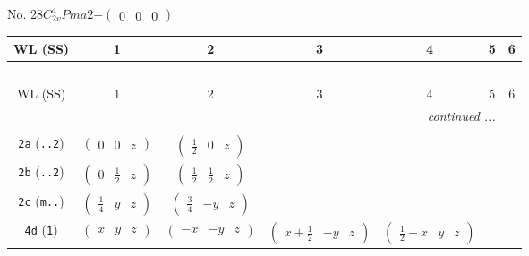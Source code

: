 \documentclass[fleqn,9pt,landscape]{jsarticle}
\begin{document}
\newpage
No. 28\quad$C_{2v}^{4}$\quad$Pma2$\quad[ orthorhombic ]\quad$+\begin{pmatrix} 0 & 0 & 0 \end{pmatrix}$
\begin{center}
\renewcommand{\arraystretch}{1.2}
\begin{longtable}{ccccccc}
 \hline \hline
WL (SS) & 1 & 2 & 3 & 4 & 5 & 6 \\ \hline \endfirsthead

\multicolumn{6}{l}{\tablename\ \thetable{}} \\
 \hline \hline
WL (SS) & 1 & 2 & 3 & 4 & 5 & 6 \\ \hline \endhead

 \hline \hline
\multicolumn{6}{r}{\footnotesize\it continued ...} \\ \endfoot

 \hline \hline
\multicolumn{6}{r}{} \\ \endlastfoot

{\tt 2a} ({\tt ..2}) & $ \begin{pmatrix} 0 & 0 & z \end{pmatrix} $ & $ \begin{pmatrix} \frac{1}{2} & 0 & z \end{pmatrix} $ & $  $ & $  $ \\ \hline
{\tt 2b} ({\tt ..2}) & $ \begin{pmatrix} 0 & \frac{1}{2} & z \end{pmatrix} $ & $ \begin{pmatrix} \frac{1}{2} & \frac{1}{2} & z \end{pmatrix} $ & $  $ & $  $ \\ \hline
{\tt 2c} ({\tt m..}) & $ \begin{pmatrix} \frac{1}{4} & y & z \end{pmatrix} $ & $ \begin{pmatrix} \frac{3}{4} & - y & z \end{pmatrix} $ & $  $ & $  $ \\ \hline
{\tt 4d} ({\tt 1}) & $ \begin{pmatrix} x & y & z \end{pmatrix} $ & $ \begin{pmatrix} - x & - y & z \end{pmatrix} $ & $ \begin{pmatrix} x + \frac{1}{2} & - y & z \end{pmatrix} $ & $ \begin{pmatrix} \frac{1}{2} - x & y & z \end{pmatrix} $ \\
\end{longtable}
\end{center}
\end{document}
